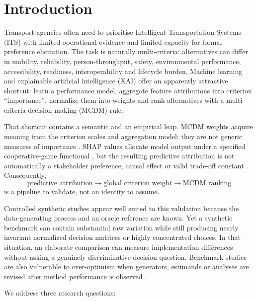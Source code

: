 \documentclass[runningheads]{llncs}
\begin{document}
\section{Introduction}
\label{sec:introduction}

Transport agencies often need to prioritise Intelligent Transportation Systems (ITS) with
limited operational evidence and limited capacity for formal preference elicitation. The task
is naturally multi-criteria: alternatives can differ in mobility, reliability,
person-throughput, safety, environmental performance, accessibility, readiness,
interoperability and lifecycle burden. Machine learning and explainable artificial intelligence
(XAI) offer an apparently attractive shortcut: learn a performance model, aggregate feature
attributions into criterion ``importance'', normalize them into weights and rank alternatives
with a multi-criteria decision-making (MCDM) rule.

That shortcut contains a semantic and an empirical leap. MCDM weights acquire meaning from the
criterion scales and aggregation model; they are not generic measures of importance
\cite{keeney1976decisions,roy1996importance,choo1999weights}. SHAP values allocate model output
under a specified cooperative-game functional \cite{lundberg2017shap}, but the resulting
predictive attribution is not automatically a stakeholder preference, causal effect or valid
trade-off constant \cite{sundararajan2020many,kumar2020shapleyproblems,janzing2020causal}.
Consequently,
\[
\text{predictive attribution}
\longrightarrow
\text{global criterion weight}
\longrightarrow
\text{MCDM ranking}
\]
is a pipeline to validate, not an identity to assume.

Controlled synthetic studies appear well suited to this validation because the data-generating
process and an oracle reference are known. Yet a synthetic benchmark can contain substantial raw
variation while still producing nearly invariant normalized decision matrices or highly
concentrated choices. In that situation, an elaborate comparison can measure implementation
differences without asking a genuinely discriminative decision question. Benchmark studies are
also vulnerable to over-optimism when generators, estimands or analyses are revised after
method performance is observed \cite{morris2019simulation,niessl2022overoptimism}.

We address three research questions:
\end{document}
